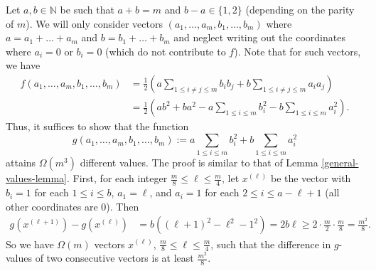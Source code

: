 \documentclass[11pt]{article}
\let\oldendproof\endproof
\renewenvironment{proof}[1][\proofname]{%
	\oldproof[\bf #1]%
}{\oldendproof}
\theoremstyle{plain}
\begin{document}
\begin{proof}[Proof of Lemma \ref{additional-lemma}]
    Let $a,b \in \mathbb{N}$ be such that $a+b = m$ and $b-a \in \{1,2\}$ (depending on the parity of $m$). 
    We will only consider vectors $(a_1,\dots,a_m,b_1,\dots,b_m)$ where $a = a_1 + \dots + a_m$ and $b = b_1 + \dots + b_m$ and neglect writing out the coordinates where $a_i = 0$ or $b_i = 0$ (which do not contribute to $f$). Note that for such vectors, we have
    \begin{align*}
        f(a_1,\dots,a_m,b_1,\dots,b_m) &= 
        \frac{1}{2} \left( a \sum_{1 \leq i \neq j \leq m} b_i b_j + b \sum_{1 \leq i \neq j \leq m} a_i a_j \right) \\&= \frac{1}{2} \left( a b^2 + b a^2 - a \sum_{1 \leq i \leq m} b_i^2 - b \sum_{1 \leq i \leq m} a_i^2 \right).
    \end{align*}
    Thus, it suffices to show that the function
    $$
    g(a_1,\dots,a_m,b_1,\dots,b_m) := a \sum_{1 \leq i \leq m} b_i^2 + b \sum_{1 \leq i \leq m} a_i^2
    $$
    attains $\Omega(m^3)$ different values.
    The proof is similar to that of Lemma \ref{general-values-lemma}.
    First, for each integer $\frac{m}{8} \leq \ell \leq \frac{m}{4}$, let $x^{(\ell)}$ be the vector with $b_i = 1$ for each $1 \leq i \leq b$, $a_1 = \ell$, and $a_i = 1$ for each $2 \leq i \leq a-\ell+1$ (all other coordinates are $0$). 
    Then
    \begin{align*}
        g(x^{(\ell+1)}) - g(x^{(\ell)}) &= b((\ell+1)^2 - \ell^2 - 1^2) 
        = 2b\ell \geq 2 \cdot \frac{m}{2} \cdot \frac{m}{8} = \frac{m^2}{8}.
    \end{align*}
    So we have $\Omega(m)$ vectors $x^{(\ell)}$, $\frac{m}{8} \leq \ell \leq \frac{m}{4}$, such that the difference in $g$-values of two consecutive vectors is at least 
    $\frac{m^2}{8}$.


\end{proof}
\end{document}
